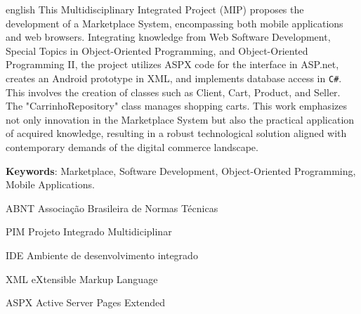 \documentclass[
	12pt,				%
	openright,			%
	twoside,			%
	a4paper,			%
	english,			%
	brazil				%
	]{abntex2}
\newcommand{\listofquadrosname}{Lista de quadros}
\begin{document}
\begin{resumo}[Abstract]
 \begin{otherlanguage*}{english}
    This Multidisciplinary Integrated Project (MIP) proposes the development of a Marketplace System, encompassing both mobile applications and web browsers. Integrating knowledge from Web Software Development, Special Topics in Object-Oriented Programming, and Object-Oriented Programming II, the project utilizes ASPX code for the interface in ASP.net, creates an Android prototype in XML, and implements database access in \texttt{C\#}. This involves the creation of classes such as Client, Cart, Product, and Seller. The "CarrinhoRepository" class manages shopping carts. This work emphasizes not only innovation in the Marketplace System but also the practical application of acquired knowledge, resulting in a robust technological solution aligned with contemporary demands of the digital commerce landscape.

   \vspace{\onelineskip}
 
   \noindent 
   \textbf{Keywords}: Marketplace, Software Development, Object-Oriented Programming, Mobile Applications.
 \end{otherlanguage*}
\end{resumo}



\tableofcontents*
\cleardoublepage


\listoffigures*
\cleardoublepage



\begin{siglas}
  \item[ABNT] Associação Brasileira de Normas Técnicas
  \item[PIM] Projeto Integrado Multidiciplinar
  \item[IDE] Ambiente de desenvolvimento integrado
  \item[XML] eXtensible Markup Language
  \item[ASPX] Active Server Pages Extended
\end{siglas}
\end{document}
